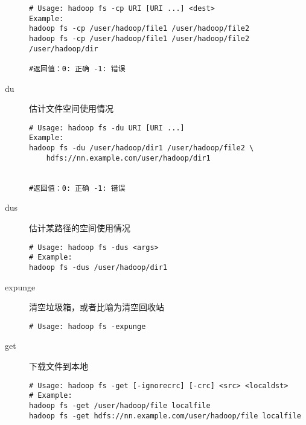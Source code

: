 \documentclass{article}
\begin{document}
\begin{description}
\begin{verbatim}
# Usage: hadoop fs -cp URI [URI ...] <dest>
Example: 
hadoop fs -cp /user/hadoop/file1 /user/hadoop/file2
hadoop fs -cp /user/hadoop/file1 /user/hadoop/file2 /user/hadoop/dir

#返回值：0: 正确 -1: 错误
\end{verbatim}

\item[du] 估计文件空间使用情况

\begin{verbatim}
# Usage: hadoop fs -du URI [URI ...]
Example: 
hadoop fs -du /user/hadoop/dir1 /user/hadoop/file2 \
	hdfs://nn.example.com/user/hadoop/dir1


#返回值：0: 正确 -1: 错误
\end{verbatim}

\item[dus] 估计某路径的空间使用情况

\begin{verbatim}
# Usage: hadoop fs -dus <args>
# Example: 
hadoop fs -dus /user/hadoop/dir1 
\end{verbatim}

\item[expunge] 清空垃圾箱，或者比喻为清空回收站

\begin{verbatim}
# Usage: hadoop fs -expunge
\end{verbatim}

\item[get] 下载文件到本地

\begin{verbatim}
# Usage: hadoop fs -get [-ignorecrc] [-crc] <src> <localdst>
# Example: 
hadoop fs -get /user/hadoop/file localfile
hadoop fs -get hdfs://nn.example.com/user/hadoop/file localfile
\end{verbatim}


\end{description}
\end{document}
